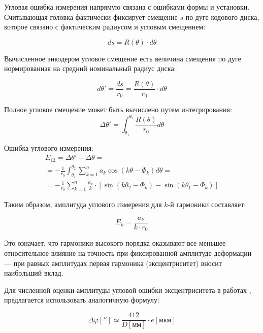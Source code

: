 Угловая ошибка измерения напрямую связана с ошибками формы и установки. Считывающая головка фактически фиксирует смещение $s$ по дуге кодового диска, которое связано с фактическим радиусом и угловым смещением:

\begin{equation*}
    ds = R(\theta)\cdot d\theta
\end{equation*}

Вычисленное энкодером угловое смещение есть величина смещения по дуге нормированная на средний номинальный радиус диска:

\begin{equation*}
    d\theta' = \frac{ds}{r_0} = \frac{R(\theta)}{r_0}\cdot d\theta
\end{equation*}

Полное угловое смещение может быть вычислено путем интегрирования:
\begin{equation*}
    \Delta \theta' = \int_{\theta_1}^{\theta_2}{\frac{R(\theta)}{r_0}d\theta}
\end{equation*}

Ошибка углового измерения:
\begin{multline*}
    E_{12} = \Delta \theta' - \Delta \theta = \\=-\frac{1}{r_0}\int_{\theta_1}^{\theta_2}{\sum_{k=1}^{n}{a_k\cos(k\theta-\Phi_k)}d\theta} = \\
    =-\frac{1}{r_0}\sum_{k=1}^{n}\frac{a_k}{k}\cdot\left[\sin(k\theta_2-\Phi_k)-\sin(k\theta_1-\Phi_k)\right]
\end{multline*}

Таким образом, амплитуда углового измерения для $k$-й гармоники составляет:

\begin{equation*}
    E_k = \frac{a_k}{k\cdot r_0}
\end{equation*}

Это означает, что гармоники высокого порядка оказывают все меньшее относительное влияние на точность при фиксированной амплитуде деформации --- при равных амплитудах первая гармоника (эксцентриситет) вносит наибольший вклад.

Для численной оценки амплитуды угловой ошибки эксцентриситета в работах \cite{eccentricity_error}, \cite{heidenhain-modular-angle-encoders} предлагается использовать аналогичную формулу:

\begin{equation*}
    \Delta \varphi[''] \simeq \frac{412}{D[\mathrm{мм}]}\cdot e[\mathrm{мкм}]
\end{equation*}

